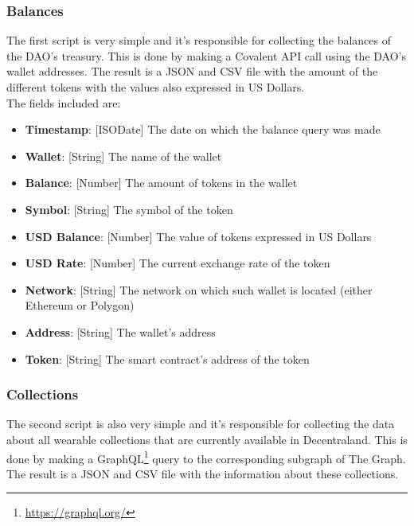 \documentclass[MSE,Master,english]{twbook}%
\begin{document}
\subsubsection{Balances}
The first script is very simple and it's responsible for collecting the balances of the DAO's treasury. This is done by making a Covalent API call using the DAO's wallet addresses. The result is a JSON and CSV file with the amount of the different tokens with the values also expressed in US Dollars. \\

The fields included are:
\begin{itemize}
  \item \textbf{Timestamp}: [ISODate] The date on which the balance query was made
  \item \textbf{Wallet}: [String] The name of the wallet
  \item \textbf{Balance}: [Number] The amount of tokens in the wallet
  \item \textbf{Symbol}: [String] The symbol of the token
  \item \textbf{USD Balance}: [Number] The value of tokens expressed in US Dollars
  \item \textbf{USD Rate}: [Number] The current exchange rate of the token
  \item \textbf{Network}: [String] The network on which such wallet is located (either Ethereum or Polygon)
  \item \textbf{Address}: [String] The wallet's address
  \item \textbf{Token}: [String] The smart contract's address of the token
\end{itemize}

\subsubsection{Collections}
The second script is also very simple and it's responsible for collecting the data about all wearable collections that are currently available in Decentraland. This is done by making a GraphQL\footnote{\url{https://graphql.org/}} query to the corresponding subgraph of The Graph. The result is a JSON and CSV file with the information about these collections. \\
\end{document}

